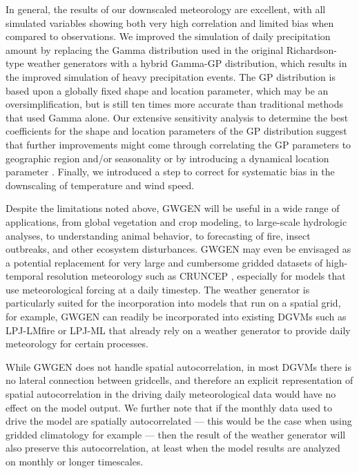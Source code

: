 \documentclass[
11pt, %
english, %
singlespacing, %
headsepline, %
]{MastersDoctoralThesis} %
\begin{document}
\begin{NoHyper}
\begin{refsection}
In general, the results of our downscaled meteorology are excellent, with all simulated variables showing both very high correlation and limited bias when compared to observations. We improved the simulation of daily precipitation amount by replacing the Gamma distribution used in the original Richardson-type weather generators with a hybrid Gamma-GP distribution, which results in the improved simulation of heavy precipitation events. The GP distribution is based upon a globally fixed shape and location parameter, which may be an oversimplification, but is still ten times more accurate than traditional methods that used Gamma alone. Our extensive sensitivity analysis to determine the best coefficients for the shape and location parameters of the GP distribution suggest that further improvements might come through correlating the GP parameters to geographic region and/or seasonality \citep{MaraunRustOsborn2009,RustMaraunOsborn2009} or by introducing a dynamical location parameter \citep{FrigessiHaugRue2002}. Finally, we introduced a step to correct for systematic bias in the downscaling of temperature and wind speed.

Despite the limitations noted above, GWGEN will be useful in a wide range of applications, from global vegetation and crop modeling, to large-scale hydrologic analyses, to understanding animal behavior, to forecasting of fire, insect outbreaks, and other ecosystem disturbances. GWGEN may even be envisaged as a potential replacement for very large and cumbersome gridded datasets of high-temporal resolution meteorology such as CRUNCEP \citep{ViovyCiais2016}, especially for models that use meteorological forcing at a daily timestep. The weather generator is particularly suited for the incorporation into models that run on a spatial grid, for example, GWGEN can readily be incorporated into existing DGVMs such as LPJ-LMfire \citep{PfeifferSpessaKaplan2013} or LPJ-ML \citep{BondeauSmithZaehleEtAl2007} that already rely on a weather generator to provide daily meteorology for certain processes. 

While GWGEN does not handle spatial autocorrelation, in most DGVMs there is no lateral connection between gridcells, and therefore an explicit representation of spatial autocorrelation in the driving daily meteorological data would have no effect on the model output. We further note that if the monthly data used to drive the model are spatially autocorrelated --– this would be the case when using gridded climatology for example --– then the result of the weather generator will also preserve this autocorrelation, at least when the model results are analyzed on monthly or longer timescales.


\end{refsection}
\end{NoHyper}
\end{document}
